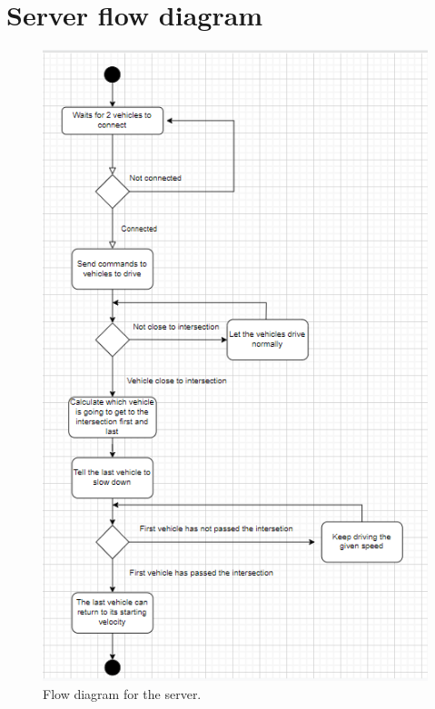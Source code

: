 \section{Server flow diagram}

\begin{figure}[h!]
	\centering
	\includegraphics[width=1\linewidth]{figures/Flow_diagram_server}
	\caption[Flow diagram server]{Flow diagram for the server.}
	\label{fig:diagramserver}
\end{figure}